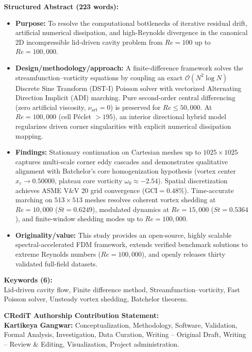 \documentclass[11pt]{article}
\begin{document}
\noindent\textbf{Structured Abstract (223 words):}
\begin{itemize}
    \item \textbf{Purpose:} To resolve the computational bottlenecks of iterative residual drift, artificial numerical dissipation, and high-Reynolds divergence in the canonical 2D incompressible lid-driven cavity problem from $Re = 100$ up to $Re = 100{,}000$.
    \item \textbf{Design/methodology/approach:} A finite-difference framework solves the streamfunction--vorticity equations by coupling an exact $\mathcal{O}(N^2 \log N)$ Discrete Sine Transform (DST-I) Poisson solver with vectorized Alternating Direction Implicit (ADI) marching. Pure second-order central differencing (zero artificial viscosity, $\nu_{\mathrm{art}} = 0$) is preserved for $Re \le 50{,}000$. At $Re = 100{,}000$ (cell P\'eclet $> 195$), an interior directional hybrid model regularizes driven corner singularities with explicit numerical dissipation mapping.
    \item \textbf{Findings:} Stationary continuation on Cartesian meshes up to $1025 \times 1025$ captures multi-scale corner eddy cascades and demonstrates qualitative alignment with Batchelor's core homogenization hypothesis (vortex center $x_c \to 0.50000$, plateau core vorticity $\omega_0 \approx -2.54$). Spatial discretization achieves ASME V\&V 20 grid convergence ($\mathrm{GCI} = 0.48\%$). Time-accurate marching on $513 \times 513$ meshes resolves coherent vortex shedding at $Re = 10{,}000$ ($St = 0.6249$), modulated dynamics at $Re = 15{,}000$ ($St = 0.5364$), and finite-window shedding modes up to $Re = 100{,}000$.
    \item \textbf{Originality/value:} This study provides an open-source, highly scalable spectral-accelerated FDM framework, extends verified benchmark solutions to extreme Reynolds numbers ($Re = 100{,}000$), and openly releases thirty validated full-field datasets.
\end{itemize}

\vspace{1em}

\noindent\textbf{Keywords (6):} \\
Lid-driven cavity flow, Finite difference method, Streamfunction--vorticity, Fast Poisson solver, Unsteady vortex shedding, Batchelor theorem.

\vspace{1.5em}

\noindent\textbf{CRediT Authorship Contribution Statement:} \\
\textbf{Kartikeya Gangwar:} Conceptualization, Methodology, Software, Validation, Formal Analysis, Investigation, Data Curation, Writing -- Original Draft, Writing -- Review \& Editing, Visualization, Project administration.
\end{document}

